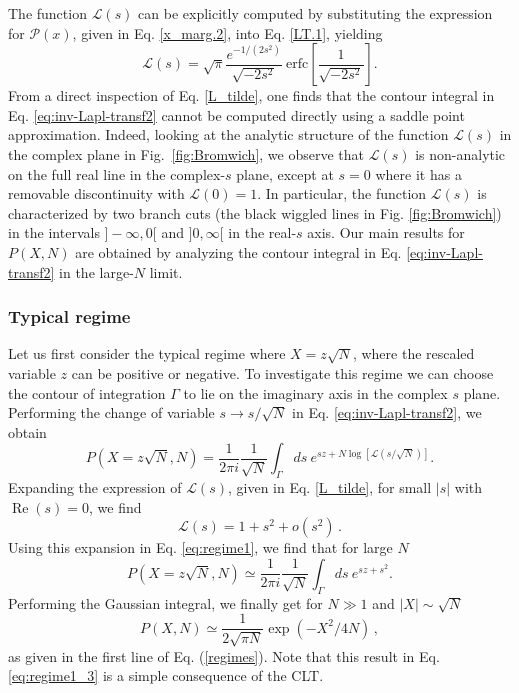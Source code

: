 \documentclass[aps,pre,twocolumn,superscriptaddress,showpacs]{revtex4-1}
\newcommand{\be}{\begin{equation}}
\newcommand{\ee}{\end{equation}}
\newcommand{\mP}{\mathcal{P}}
\newcommand{\mL}{\mathcal{L}}
\begin{document}
The function $\mL(s)$ can be explicitly computed by substituting the expression for $\mP(x)$, given in Eq. \eqref{x_marg.2}, into Eq. \eqref{LT.1}, yielding
\be
\mL(s)= \sqrt{\pi} \frac{e^{-1/(2s^2)}}{\sqrt{-2 s^2}}~\textrm{erfc}\left[\frac{1}{\sqrt{-2s^2}}\right].
\label{L_tilde}
\ee
From a direct inspection of Eq. \eqref{L_tilde}, one finds that the contour integral in Eq. \eqref{eq:inv-Lapl-transf2} cannot be computed directly using a saddle point approximation. Indeed, looking at the analytic structure of the function $\mL(s)$ in the complex plane in
Fig.~\ref{fig:Bromwich}, we observe that $\mL(s)$ is non-analytic on the full real line in the complex-$s$ plane, except at $s=0$ where it has a removable discontinuity with $\mL(0)=1$. In particular, the function $\mL(s)$ is characterized by two branch cuts (the black wiggled lines in Fig. \ref{fig:Bromwich}) in the intervals $]-\infty,0[$ and $]0,\infty[$ in the real-$s$ axis. Our main results for $P(X,N)$ are obtained by analyzing the contour integral in Eq. \eqref{eq:inv-Lapl-transf2} in the large-$N$ limit.

\subsubsection{Typical regime}

Let us first consider the typical regime where $X= z \sqrt{N}$, where the rescaled variable $z$ can be positive or negative. To investigate this regime we can choose the contour of integration $\Gamma$ to lie on the imaginary axis in the complex $s$ plane. Performing the change of variable $s\to s/\sqrt{N}$ in Eq. \eqref{eq:inv-Lapl-transf2}, we obtain
\be
P(X=z \sqrt{N},N) = \frac{1}{2\pi i} \frac{1}{\sqrt{N}}
\int_{\Gamma} ds~e^{sz+N\log[\mL(s/\sqrt{N})]}.
\label{eq:regime1}
\ee
Expanding the expression of $\mL(s)$, given in Eq. \eqref{L_tilde}, for small $|s|$ with $\operatorname{Re}(s)=0$, we find
\begin{equation}
\mL(s)=1+s^2+o(s^2)\,.
\label{eq:expansion1}
\end{equation}
Using this expansion in Eq. \eqref{eq:regime1}, we find that for large $N$
\be
P(X= z \sqrt{N},N) \simeq\frac{1}{2\pi i} \frac{1}{\sqrt{N}}
\int_{\Gamma} ds~e^{sz+s^2}.
\label{eq:regime1_2}
\ee
Performing the Gaussian integral, we finally get for $N\gg 1$ and $|X|\sim \sqrt{N}$
\be
P(X,N) \simeq \frac{1}{2\sqrt{\pi N}}\exp\left(- X^2/4  N\right)\,,
\label{eq:regime1_3}
\ee
as given in the first line of Eq. (\ref{regimes}). Note that this result in Eq. \eqref{eq:regime1_3} is a simple consequence of the CLT.
\end{document}
